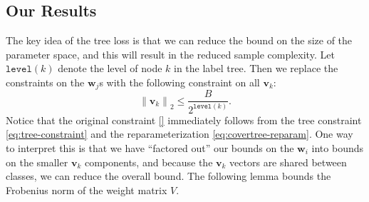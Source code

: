 \documentclass[twoside]{article}
\theoremstyle{definition}
\newcommand{\vv}{\mathbf v}
\newcommand{\w}{\mathbf w}
\newcommand{\ltwo}[1]{{\lVert {#1} \rVert}_2}
\newcommand{\level}[1]{\texttt{level}({#1})}
\begin{document}
\subsection{Our Results}

The key idea of the tree loss is that we can reduce the bound on the size of the parameter space,
and this will result in the reduced sample complexity.
Let $\level k$ denote the level of node $k$ in the label tree.
Then we replace the constraints on the $\w_j$s with the following constraint on all $\vv_k$:
\begin{equation}
    \ltwo{\vv_k} \le \frac{B}{2^{\level k}}
    .
    \label{eq:tree-constraint}
\end{equation}
Notice that the original constraint \eqref{} immediately follows from the tree constraint \eqref{eq:tree-constraint} and the reparameterization \eqref{eq:covertree-reparam}.
One way to interpret this is that we have ``factored out'' our bounds on the $\w_i$ into bounds on the smaller $\vv_k$ components,
and because the $\vv_k$ vectors are shared between classes,
we can reduce the overall bound.
The following lemma bounds the Frobenius norm of the weight matrix $V$.
\end{document}
